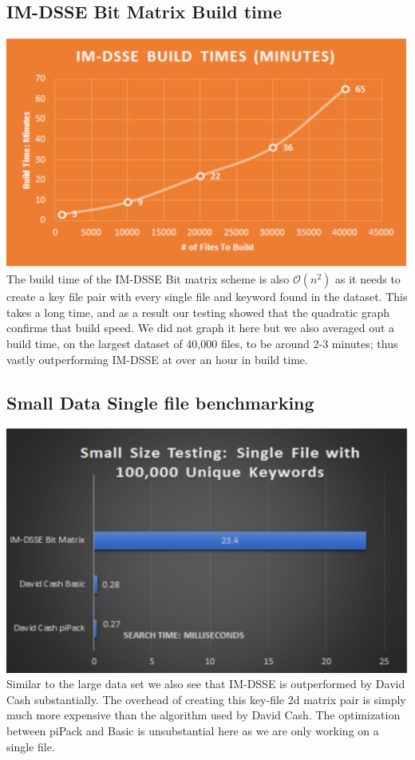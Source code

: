\subsection{IM-DSSE Bit Matrix Build time}
\includegraphics[width=1\textwidth]{Charts/time.eps}
The build time of the IM-DSSE Bit matrix scheme is also $\mathcal{O}(n^2)$ as it needs to create a key file pair with every single file and keyword found in the dataset. This takes a long time, and as a result our testing showed that the quadratic graph confirms that build speed. We did not graph it here but we also averaged out a build time, on the largest dataset of 40,000 files, to be around 2-3 minutes; thus vastly outperforming IM-DSSE at over an hour in build time.

\subsection{Small Data Single file benchmarking}
\includegraphics[width=.8\textwidth]{Charts/small.eps}
Similar to the large data set we also see that IM-DSSE is outperformed by David Cash substantially. The overhead of creating this key-file 2d matrix pair is simply much more expensive than the algorithm used by David Cash. The optimization between piPack and Basic is unsubstantial here as we are only working on a single file.
